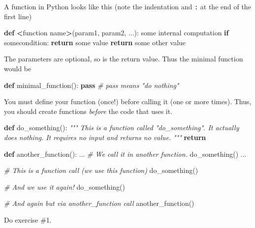 \documentclass[
]{book}
\newenvironment{Shaded}{\begin{snugshade}}{\end{snugshade}}
\newcommand{\CommentTok}[1]{\textcolor[rgb]{0.56,0.35,0.01}{\textit{#1}}}
\newcommand{\ControlFlowTok}[1]{\textcolor[rgb]{0.13,0.29,0.53}{\textbf{#1}}}
\newcommand{\KeywordTok}[1]{\textcolor[rgb]{0.13,0.29,0.53}{\textbf{#1}}}
\newcommand{\NormalTok}[1]{#1}
\newcommand{\OperatorTok}[1]{\textcolor[rgb]{0.81,0.36,0.00}{\textbf{#1}}}
\begin{document}
A function in Python looks like this (note the indentation and \texttt{:} at the end of the first line)

\begin{Shaded}
\begin{Highlighting}[]
\KeywordTok{def} \OperatorTok{\textless{}}\NormalTok{function name}\OperatorTok{\textgreater{}}\NormalTok{(param1, param2, ...):}
\NormalTok{    some internal computation}
    \ControlFlowTok{if}\NormalTok{ somecondition:}
        \ControlFlowTok{return}\NormalTok{ some value}
    \ControlFlowTok{return}\NormalTok{ some other value}
\end{Highlighting}
\end{Shaded}

The parameters are optional, so is the return value. Thus the minimal function would be

\begin{Shaded}
\begin{Highlighting}[]
\KeywordTok{def}\NormalTok{ minimal\_function():}
    \ControlFlowTok{pass} \CommentTok{\# pass means "do nothing"}
\end{Highlighting}
\end{Shaded}

You must define your function (once!) before calling it (one or more times). Thus, you should create functions \emph{before} the code that uses it.

\begin{Shaded}
\begin{Highlighting}[]
\KeywordTok{def}\NormalTok{ do\_something():}
    \CommentTok{"""}
\CommentTok{    This is a function called "do\_something". It actually does nothing.}
\CommentTok{    It requires no input and returns no value.}
\CommentTok{    """}
    \ControlFlowTok{return}
    
\KeywordTok{def}\NormalTok{ another\_function():}
\NormalTok{    ...}
    \CommentTok{\# We call it in another function.}
\NormalTok{    do\_something()}
\NormalTok{    ...}

\CommentTok{\# This is a function call (we use this function)}
\NormalTok{do\_something()}

\CommentTok{\# And we use it again!}
\NormalTok{do\_something()}

\CommentTok{\# And again but via another\_function call}
\NormalTok{another\_function()}
\end{Highlighting}
\end{Shaded}

Do exercise \#1.
\end{document}
